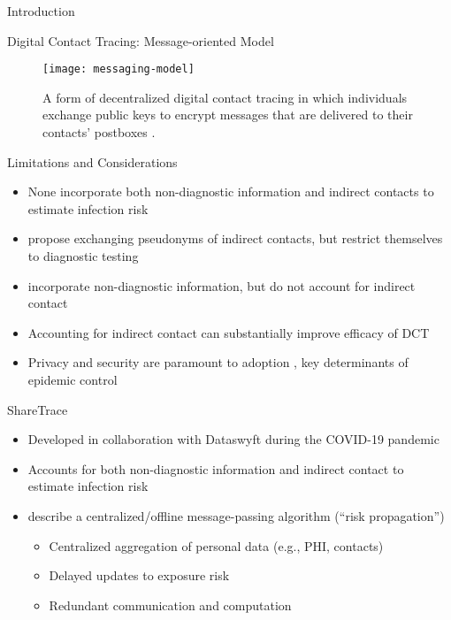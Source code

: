 \documentclass[11pt]{beamer}
\begin{document}
\begin{section}{Introduction}
\begin{frame}{Digital Contact Tracing: Message-oriented Model}
\begin{figure}
  \centering
  \texttt{[image: messaging-model]}
  \caption[Message-oriented model]{A form of decentralized digital contact tracing in which individuals exchange public keys to encrypt messages that are delivered to their contacts' postboxes \cite{Reichert2021}.}
\end{figure}
\end{frame}

\begin{frame}{Limitations and Considerations}
\begin{itemize}
  \item None incorporate both non-diagnostic information and indirect contacts to estimate infection risk
  \pause
  \item \citet{Cherini2023} propose exchanging pseudonyms of indirect contacts, but restrict themselves to diagnostic testing
  \pause
  \item \citet{Gupta2023} incorporate non-diagnostic information, but do not account for indirect contact
  \pause
  \item Accounting for indirect contact can substantially improve efficacy of DCT \citep{PozoMartin2023}
  \pause
  \item Privacy and security are paramount to adoption \citep{Oyibo2022, Afroogh2022}, key determinants of epidemic control \citep{PozoMartin2023}
\end{itemize}
\end{frame}

\begin{frame}{ShareTrace}
\begin{itemize}
  \item Developed in collaboration with Dataswyft during the COVID-19 pandemic \citep{Ayday2020}
  \pause
  \item Accounts for both non-diagnostic information and indirect contact to estimate infection risk
  \pause
  \item \citet{Ayday2021} describe a centralized/offline message-passing algorithm (``risk propagation'')
    \pause
    \begin{itemize}
      \item Centralized aggregation of personal data (e.g., PHI, contacts)
      \pause
      \item Delayed updates to exposure risk
      \pause
      \item Redundant communication and computation
    \end{itemize}
\end{itemize}
\end{frame}


\end{section}
\end{document}
